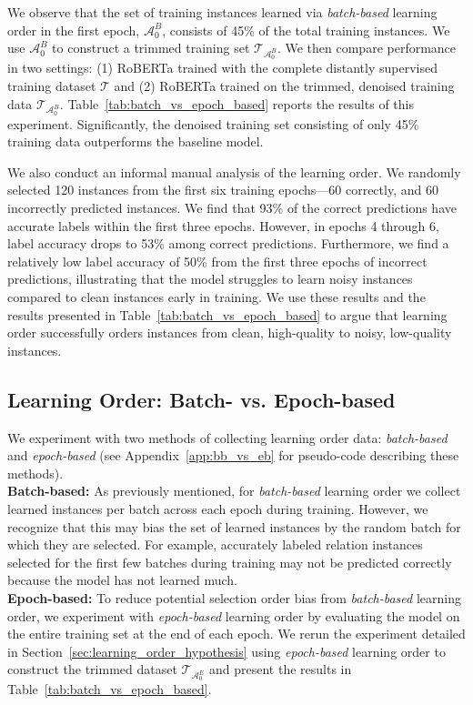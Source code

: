 We observe that the set of training instances learned via \textit{batch-based} learning order in the first epoch, $\mathcal{A}_0^B$, consists of 45\% of the total training instances. We use $\mathcal{A}_0^B$ to construct a trimmed training set $\mathcal{T}_{\mathcal{A}_0^B}$. We then compare performance in two settings: (1) RoBERTa trained with the complete distantly supervised training dataset $\mathcal{T}$ and (2) RoBERTa trained on the trimmed, denoised training data $\mathcal{T}_{\mathcal{A}_0^B}$. Table~\ref{tab:batch_vs_epoch_based} reports the results of this experiment. Significantly, the denoised training set consisting of only 45\% training data outperforms the baseline model. 

We also conduct an informal manual analysis of the learning order. We randomly selected 120 instances from the first six training epochs---60 correctly, and 60 incorrectly predicted instances. We find that 93\% of the correct predictions have accurate labels within the first three epochs. However, in epochs 4 through 6, label accuracy drops to 53\% among correct predictions. Furthermore, we find a relatively low label accuracy of 50\% from the first three epochs of incorrect predictions, illustrating that the model struggles to learn noisy instances compared to clean instances early in training. We use these results and the results presented in Table~\ref{tab:batch_vs_epoch_based} to argue that learning order successfully orders instances from clean, high-quality to noisy, low-quality instances. 



\subsection{Learning Order: Batch- vs. Epoch-based}
We experiment with two methods of collecting learning order data: \textit{batch-based} and \textit{epoch-based} (see Appendix~\ref{app:bb_vs_eb} for pseudo-code describing these methods). \\
\textbf{Batch-based:} As previously mentioned, for \textit{batch-based} learning order we collect learned instances per batch across each epoch during training. However, we recognize that this may bias the set of learned instances by the random batch for which they are selected. For example, accurately labeled relation instances selected for the first few batches during training may not be predicted correctly because the model has not learned much. \\
\textbf{Epoch-based:} To reduce potential selection order bias from \textit{batch-based} learning order, we experiment with \textit{epoch-based} learning order 
by evaluating the model on the entire training set at the end of each epoch. We rerun the experiment detailed in Section~\ref{sec:learning_order_hypothesis} using \textit{epoch-based} learning order to construct the trimmed dataset $\mathcal{T}_{\mathcal{A}_0^E}$ and present the results in Table~\ref{tab:batch_vs_epoch_based}.

